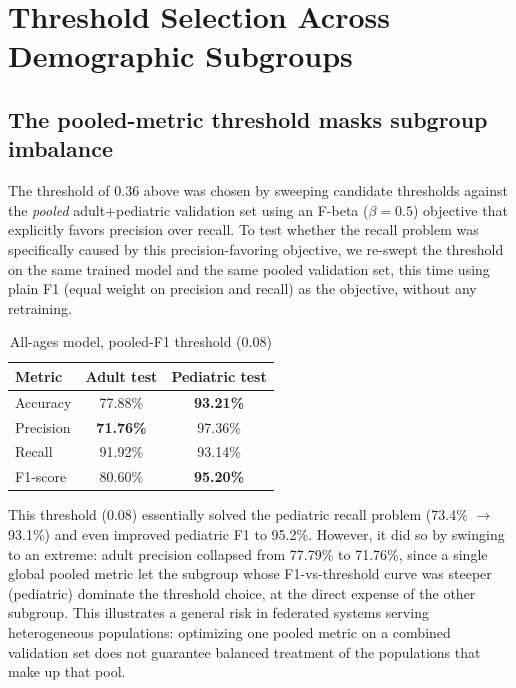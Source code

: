 \documentclass[conference]{IEEEtran}
\begin{document}
\section{Threshold Selection Across Demographic Subgroups}
\label{sec:threshold}

\subsection{The pooled-metric threshold masks subgroup imbalance}

The threshold of 0.36 above was chosen by sweeping candidate thresholds
against the \emph{pooled} adult+pediatric validation set using an
F-beta ($\beta=0.5$) objective that explicitly favors precision over
recall. To test whether the recall problem was specifically caused by this
precision-favoring objective, we re-swept the threshold on the same trained
model and the same pooled validation set, this time using plain F1 (equal
weight on precision and recall) as the objective, without any retraining.

\begin{table}[htbp]
\caption{All-ages model, pooled-F1 threshold (0.08)}
\begin{center}
\begin{tabular}{lcc}
\toprule
\textbf{Metric} & \textbf{Adult test} & \textbf{Pediatric test} \\
\midrule
Accuracy  & 77.88\% & \textbf{93.21\%} \\
Precision & \textbf{71.76\%} & 97.36\% \\
Recall    & 91.92\% & 93.14\% \\
F1-score  & 80.60\% & \textbf{95.20\%} \\
\bottomrule
\end{tabular}
\label{tab:f1-allages}
\end{center}
\end{table}

This threshold (0.08) essentially solved the pediatric recall problem
(73.4\% $\rightarrow$ 93.1\%) and even improved pediatric F1 to 95.2\%.
However, it did so by swinging to an extreme: adult precision collapsed
from 77.79\% to 71.76\%, since a single global pooled metric let the
subgroup whose F1-vs-threshold curve was steeper (pediatric) dominate the
threshold choice, at the direct expense of the other subgroup. This
illustrates a general risk in federated systems serving heterogeneous
populations: optimizing one pooled metric on a combined validation set does
not guarantee balanced treatment of the populations that make up that pool.
\end{document}
